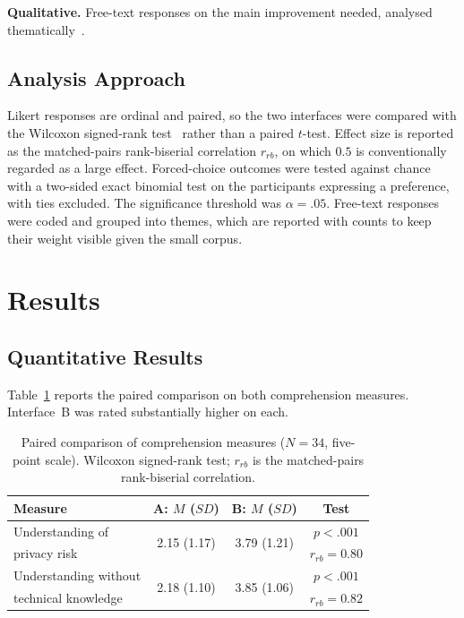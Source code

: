 \documentclass[sigconf]{acmart}
\begin{document}
\textbf{Qualitative.} Free-text responses on the main improvement needed,
analysed thematically~\cite{braun2006thematic}.

\subsection{Analysis Approach}

Likert responses are ordinal and paired, so the two interfaces were
compared with the Wilcoxon signed-rank
test~\cite{wilcoxon1945individual} rather than a paired $t$-test. Effect
size is reported as the matched-pairs rank-biserial correlation $r_{rb}$,
on which $0.5$ is conventionally regarded as a large effect. Forced-choice
outcomes were tested against chance with a two-sided exact binomial test on
the participants expressing a preference, with ties excluded. The
significance threshold was $\alpha = .05$. Free-text responses were coded
and grouped into themes, which are reported with counts to keep their
weight visible given the small corpus.

\section{Results}

\subsection{Quantitative Results}

Table~\ref{tab:likert} reports the paired comparison on both comprehension
measures. Interface~B was rated substantially higher on each.

\begin{table}[t]
\caption{Paired comparison of comprehension measures ($N=34$, five-point
scale). Wilcoxon signed-rank test; $r_{rb}$ is the matched-pairs
rank-biserial correlation.}
\label{tab:likert}
\small
\begin{tabular}{@{}lccc@{}}
\toprule
\textbf{Measure} & \textbf{A: $M$ ($SD$)} & \textbf{B: $M$ ($SD$)} & \textbf{Test} \\
\midrule
Understanding of & \multirow{2}{*}{2.15 (1.17)} & \multirow{2}{*}{3.79 (1.21)} & $p<.001$ \\
privacy risk & & & $r_{rb}=0.80$ \\
\addlinespace
Understanding without & \multirow{2}{*}{2.18 (1.10)} & \multirow{2}{*}{3.85 (1.06)} & $p<.001$ \\
technical knowledge & & & $r_{rb}=0.82$ \\
\bottomrule
\end{tabular}
\end{table}
\end{document}
